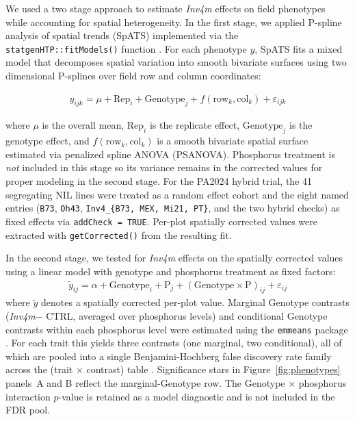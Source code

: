 \documentclass[9pt,twocolumn,twoside]{rilabRxiv}
\newcommand{\invfour}{\textit{Inv4m}\xspace}
\begin{document}
We used a two stage approach to estimate \invfour effects on field phenotypes while accounting for spatial heterogeneity.
In the first stage, we applied P-spline analysis of spatial trends (SpATS) \cite{rodriguez-alvarez2018} implemented via the \texttt{statgenHTP::fitModels()} function \cite{millet2025}.
For each phenotype $y$, SpATS fits a mixed model that decomposes spatial variation into smooth bivariate surfaces using two dimensional P-splines over field row and column coordinates:

\begin{eqnarray}
\label{eq:pheno_model}
y_{ijk} = \mu + \text{Rep}_i + \text{Genotype}_j + f(\text{row}_k, \text{col}_k) + \varepsilon_{ijk}
\end{eqnarray}

where $\mu$ is the overall mean, $\text{Rep}_i$ is the replicate effect, $\text{Genotype}_j$ is the genotype effect, and $f(\text{row}_k, \text{col}_k)$ is a smooth bivariate spatial surface estimated via penalized spline ANOVA (PSANOVA).
Phosphorus treatment is \textit{not} included in this stage so its variance remains in the corrected values for proper modeling in the second stage.
For the PA2024 hybrid trial, the 41 segregating NIL lines were treated as a random effect cohort and the eight named entries (\texttt{B73}, \texttt{Oh43}, \texttt{Inv4\_\{B73, MEX, Mi21, PT\}}, and the two hybrid checks) as fixed effects via \texttt{addCheck = TRUE}.
Per-plot spatially corrected values were extracted with \texttt{getCorrected()} from the resulting fit.

In the second stage, we tested for \invfour effects on the spatially corrected values using a linear model with genotype and phosphorus treatment as fixed factors:
\begin{eqnarray}
\label{eq:stage2_model}
\tilde{y}_{ij} = \alpha + \text{Genotype}_i + \text{P}_j + (\text{Genotype} \times \text{P})_{ij} + \varepsilon_{ij}
\end{eqnarray}
where $\tilde{y}$ denotes a spatially corrected per-plot value.
Marginal Genotype contrasts (\invfour $-$ CTRL, averaged over phosphorus levels) and conditional Genotype contrasts within each phosphorus level were estimated using the \texttt{emmeans} package \cite{lenth2025}.
For each trait this yields three contrasts (one marginal, two conditional), all of which are pooled into a single Benjamini-Hochberg false discovery rate family across the (trait $\times$ contrast) table \cite{benjamini1995}.
Significance stars in Figure~\ref{fig:phenotypes} panels~A and B reflect the marginal-Genotype row.
The Genotype $\times$ phosphorus interaction $p$-value is retained as a model diagnostic and is not included in the FDR pool.
\end{document}
